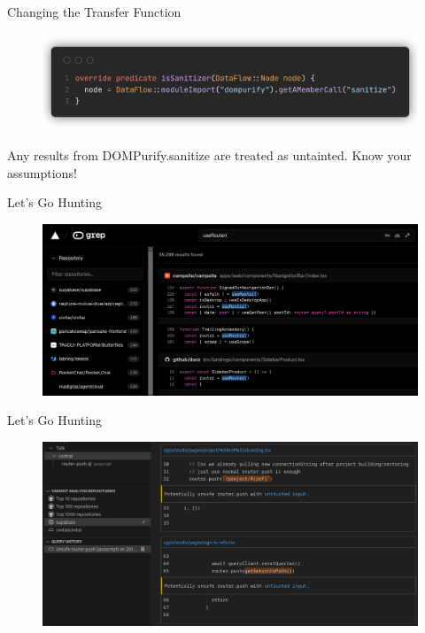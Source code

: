 \documentclass[aspectratio=169,xcolor=dvipsnames]{beamer}
\begin{document}
\begin{frame}{Changing the Transfer Function}

	\begin{figure}
		\includegraphics[width=\textwidth]{img/7.png}
	\end{figure}

	Any results from DOMPurify.sanitize are treated as untainted. Know your
	assumptions!
\end{frame}

\begin{frame}{Let's Go Hunting}

	\begin{figure}
		\includegraphics[width=\textwidth]{img/8.png}
	\end{figure}

\end{frame}

\begin{frame}{Let's Go Hunting}
	\begin{figure}
		\includegraphics[height=0.75\textheight]{img/9.png}
	\end{figure}

\end{frame}
\end{document}
